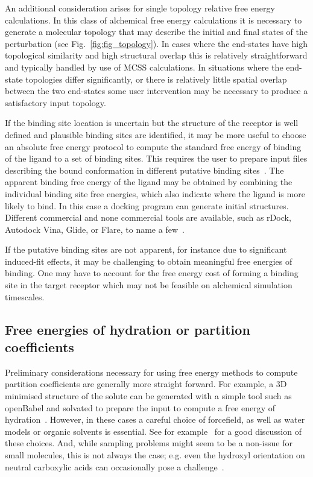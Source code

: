 \documentclass[9pt,bestpractices]{livecoms}
\begin{document}
An additional consideration arises for single topology relative free energy calculations. In this class of alchemical free energy calculations it is necessary to generate a molecular topology that may describe the initial and final states of the perturbation (see Fig.~\ref{fig:fig_topology}). In cases where the end-states have high topological similarity and high structural overlap this is relatively straightforward and typically handled by use of MCSS calculations. In situations where the end-state topologies differ significantly, or there is relatively little spatial overlap between the two end-states some user intervention may be necessary to produce a satisfactory input topology.

If the binding site location is uncertain but the structure of the receptor is well defined and plausible binding sites are identified, it may be more useful to choose an absolute free energy protocol to compute the standard free energy of binding of the ligand to a set of binding sites. This requires the user to prepare input files describing the bound conformation in different putative binding sites~\cite{evoli2016multiple}. The apparent binding free energy of the ligand may be obtained by combining the individual binding site free energies, which also indicate where the ligand is more likely to bind. In this case a docking program can generate initial structures. Different commercial and none commercial tools are available, such as rDock, Autodock Vina, Glide, or Flare, to name a few~\cite{ruiz-carmona2014rdock, trott2010autodock, friesner2004glide, kuhn2020assessment}. 

If the putative binding sites are not apparent, for instance due to significant induced-fit effects, it may be challenging to obtain meaningful free energies of binding. One may have to account for the free energy cost of forming a binding site in the target receptor which may not be feasible on alchemical simulation timescales.

\subsection{Free energies of hydration or partition coefficients}
\label{subsec:hydration}
Preliminary considerations necessary for using free energy methods to compute partition coefficients are generally more straight forward. For example, a 3D minimised structure of the solute can be generated with a simple tool such as openBabel and solvated to prepare the input to compute a free energy of hydration~\cite{oboyle2011open}. However, in these cases a careful choice of forcefield, as well as water models or organic solvents is essential. See for example~\cite{bosisio2016blinded,rustenburg2016measuring} for a good discussion of these choices. And, while sampling problems might seem to be a non-issue for small molecules, this is not always the case; e.g. even the hydroxyl orientation on neutral carboxylic acids can occasionally pose a challenge~\cite{klimovich2010predicting, lim2019assessing}.
\end{document}
